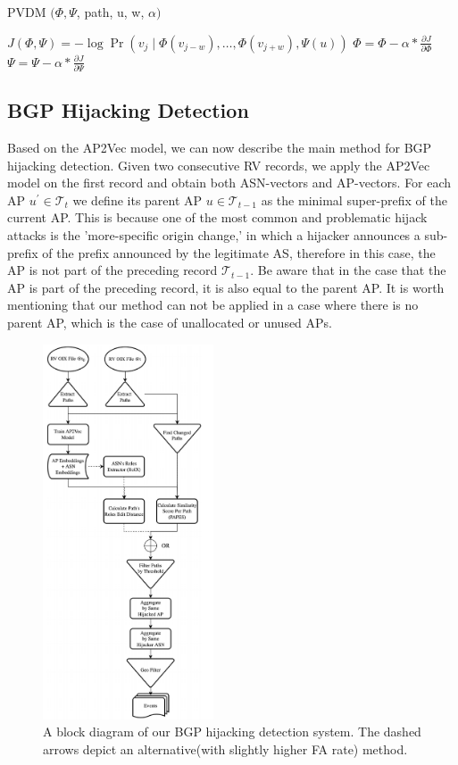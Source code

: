 \documentclass[10pt,journal]{IEEEtran}
\begin{document}
\begin{algorithm}[htbp]
\caption{PVDM $(\Phi,\Psi$, path, u, w, $\alpha)$}
\label{alg:pvdm}
\begin{algorithmic}[1]
\State $J(\Phi,\Psi) = -\log \Pr(v_j \mid \Phi(v_{j-w}), \ldots, \Phi(v_{j+w}), \Psi(u))$
\State $\Phi = \Phi - \alpha * \frac{\partial J}{\partial \Phi}$
\State $\Psi = \Psi - \alpha * \frac{\partial J}{\partial \Psi}$
\EndFor
\end{algorithmic}
\end{algorithm}

\subsection{BGP Hijacking Detection}
Based on the AP2Vec model, we can now describe the main method for BGP hijacking detection. Given two consecutive RV records, we apply the AP2Vec model on the first record and obtain both ASN-vectors and AP-vectors. For each AP $u^{\prime} \in \mathcal{T}_{t}$ we define its parent AP $u \in \mathcal{T}_{t-1}$ as the minimal super-prefix of the current AP. This is because one of the most common and problematic hijack attacks is the 'more-specific origin change,' in which a hijacker announces a sub-prefix of the prefix announced by the legitimate AS, therefore in this case, the AP is not part of the preceding record $\mathcal{T}_{t-1}$. Be aware that in the case that the AP is part of the preceding record, it is also equal to the parent AP. It is worth mentioning that our method can not be applied in a case where there is no parent AP, which is the case of unallocated or unused APs.

\begin{figure}[htbp]
\centering
\includegraphics[width=0.45\textwidth]{figures/fig3.png}
\caption{A block diagram of our BGP hijacking detection system. The dashed arrows depict an alternative(with slightly higher FA rate) method.}
\label{fig:system_diagram}
\end{figure}
\end{document}
